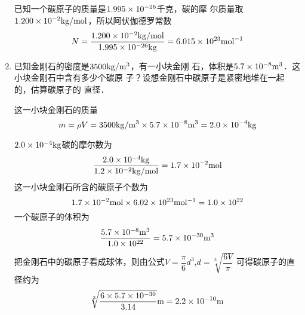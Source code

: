 \begin{enumerate}
\begin{solution}
    已知一个碳原子的质量是$1.995\times10^{-26}$千克，碳的摩
尔质量取$1.200\times10^{-2}{\rm kg/mol}$，所以阿伏伽德罗常数
\[N=\frac{1.200\times10^{-2}{\rm kg/mol}}{1.995\times10^{-26}{\rm kg}}=6.015\times 10^{23}{\rm mol}^{-1}\]
\end{solution}
\item  已知金刚石的密度是$3500{\rm kg/m^3}$，有一小块金刚
石，体积是$5.7\times 10^{-8}{\rm m^3}$．这小块金刚石中含有多少个碳原
子？设想金刚石中碳原子是紧密地堆在一起的，估算碳原子的
直径．

\begin{solution}
    这一小块金刚石的质量
\[m=\rho V=3500{\rm kg/m^3}\times 5.7\times 10^{-8}{\rm m^3}=2.0\times 10^{-4}{\rm kg}\]

$2.0\times 10^{-4}{\rm kg}$碳的摩尔数为
\[\frac{2.0\times 10^{-4}{\rm kg}}{1.2\times 10^{-2}{\rm kg/mol}}=1.7\times 10^{-2}{\rm mol}\]
这一小块金刚石所含的碳原子个数为
\[1.7\times10^{-2}{\rm mol}\times6.02\times10^{23}{\rm mol^{-1}}=1.0\times10^{22}\]
一个碳原子的体积为
\[\frac{5.7\times10^{-8}{\rm m^3}}{1.0\times10^{22}}=5.7\times10^{-30}{\rm m^3}\]
把金刚石中的碳原子看成球体，则由公式$V=\dfrac{\pi}{6}d^3$,\quad $d=\sqrt[3]{\dfrac{6V}{\pi}}$
可得碳原子的直径约为
\[\sqrt[3]{\frac{6\times5.7\times10^{-30}}{3.14}}{\rm m}=2.2\times10^{-10}{\rm m}\]
\end{solution}
\end{enumerate}

